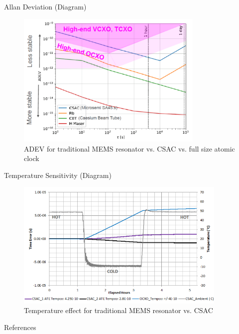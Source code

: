 \documentclass[10pt]{beamer}
\begin{document}
\begin{frame}{Allan Deviation (Diagram)}
    \begin{figure}
        \centering
        \includegraphics[width=0.8\textwidth]{img/allan_diagram}
        \caption{ADEV for traditional MEMS resonator vs. CSAC vs. full size atomic clock \cite{JRC-Tecnical-Report-1}}
    \end{figure}
\end{frame}



\begin{frame}{Temperature Sensitivity (Diagram)}
    \begin{figure}
        \centering
        \includegraphics[width=0.9\textwidth]{img/temperature_deviation_effect}
        \caption{Temperature effect for traditional MEMS resonator vs. CSAC \cite{Microsemi-Temperature-Sentivity}}
    \end{figure}
\end{frame}



\begin{frame}[allowframebreaks]{References}
    
    
\end{frame}
\end{document}

